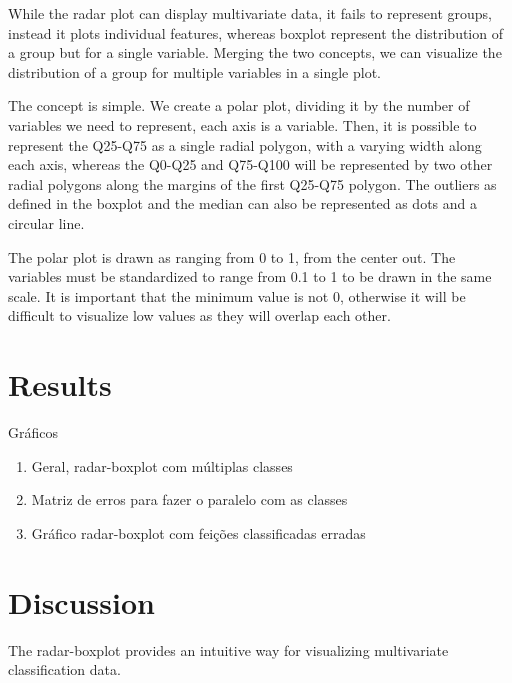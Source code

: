 \documentclass[12pt]{article}
\begin{document}
While the radar plot can display multivariate data, it fails to represent groups, instead it plots individual features, whereas boxplot represent the distribution of a group but for a single variable. Merging the two concepts, we can visualize the distribution of a group for multiple variables in a single plot. 

The concept is simple. We create a polar plot, dividing it by the number of variables we need to represent, each axis is a variable. Then, it is possible to represent the Q25-Q75 as a single radial polygon, with a varying width along each axis, whereas the Q0-Q25 and Q75-Q100 will be represented by two other radial polygons along the margins of the first Q25-Q75 polygon. The outliers as defined in the boxplot and the median can also be represented as dots and a circular line.

The polar plot is drawn as ranging from 0 to 1, from the center out. The variables must be standardized to range from 0.1 to 1 to be drawn in the same scale. It is important that the minimum value is not 0, otherwise it will be difficult to visualize low values as they will overlap each other.

\section{Results}
\label{sec:results}
Gráficos
\begin{enumerate}
  \item Geral, radar-boxplot com múltiplas classes
  \item Matriz de erros para fazer o paralelo com as classes
  \item Gráfico radar-boxplot com feições classificadas erradas
\end{enumerate}


\section{Discussion}
\label{sec:conc}
\bigskip
The radar-boxplot provides an intuitive way for visualizing multivariate classification data. 




\end{document}
